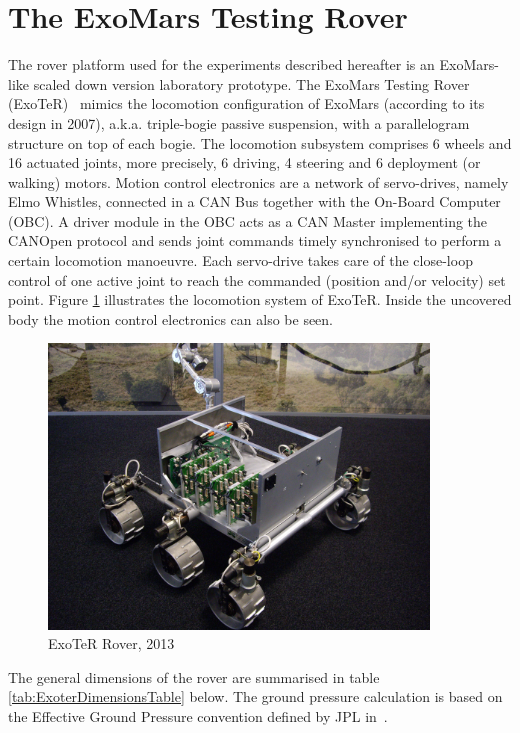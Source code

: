 \documentclass[a4paper,twocolumn]{esapub2005} %
\begin{document}
\section{The ExoMars Testing Rover}

The rover platform used for the experiments described hereafter is an
ExoMars-like scaled down version laboratory prototype. The ExoMars Testing
Rover (ExoTeR)~\cite{Azkarate2015} mimics the locomotion configuration of
ExoMars (according to its design in 2007), a.k.a. triple-bogie passive
suspension, with a parallelogram structure on top of each bogie. The locomotion
subsystem comprises 6 wheels and 16 actuated joints, more precisely, 6 driving,
4 steering and 6 deployment (or walking) motors.  Motion control electronics
are a network of servo-drives, namely Elmo Whistles, connected in a CAN Bus
together with the On-Board Computer (OBC). A driver module in the OBC acts as a CAN
Master implementing the CANOpen protocol and sends joint commands timely
synchronised to perform a certain locomotion manoeuvre. Each servo-drive takes
care of the close-loop control of one active joint to reach the commanded
(position and/or velocity) set point.  Figure \ref{fig:ExoterRover2013} illustrates the locomotion
system of ExoTeR. Inside the uncovered body the motion control electronics can
also be seen.

\begin{figure}[h!]
    \centering
    \includegraphics[width=0.9\textwidth]{ExoterRover2013.jpg}
    \caption{ExoTeR Rover, 2013}
    \label{fig:ExoterRover2013}
\end{figure}

The general dimensions of the rover are summarised in table 
\ref{tab:ExoterDimensionsTable} below. The ground pressure calculation is based 
on the Effective Ground Pressure convention defined by JPL 
in~\cite{ROB:ROB21481}.
\end{document}
